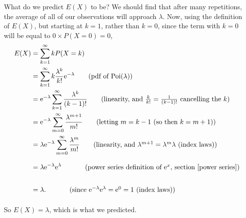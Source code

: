 \noindent What do we predict $E(X)$ to be? We should find that after many repetitions, the average of all of our observations will approach $\lambda$. Now, using the definition of $E(X)$, but starting at $k = 1$, rather than $k = 0$, since the term with $k = 0$ will be equal to $0\times P(X = 0) = 0$,
\begin{align*}
E(X)  & = \sum_{k = 1}^\infty kP(X = k) \\
	& = \sum_{k = 1}^\infty k \frac{\lambda^k}{k!}\e^{-\lambda} \tag{pdf of Poi($\lambda$)} \\
	& = \e^{-\lambda} \sum_{k = 1}^\infty \frac{\lambda^k}{(k-1)!} \tag{linearity, and $\frac{k}{k!} = \frac{1}{(k-1)!}$ cancelling the $k$}  \\
	& =  \e^{-\lambda} \sum_{m = 0}^\infty \frac{\lambda^{m+1}}{m!} \tag{letting $m = k-1$ (so then $k = m+1$)} \\
	& =  \lambda \e^{-\lambda} \sum_{m = 0}^\infty \frac{\lambda^{m}}{m!} \tag{linearity, and $\lambda^{m+1} = \lambda^m\lambda$ (index laws)} \\
	& = \lambda \e^{-\lambda} \e^\lambda \phantom{\sum_m^\infty} \tag{power series definition of $\e^x$, section \ref{power series}}  \\
	& = \lambda. \phantom{\sum_m^\infty} \tag{since $\e^{-\lambda} \e^\lambda = \e^0 = 1$ (index laws)}
\end{align*}
So $E(X) = \lambda$, which is what we predicted.

